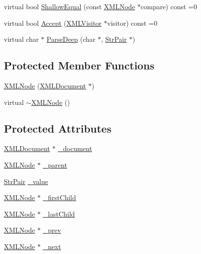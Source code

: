 \begin{DoxyCompactItemize}
\item 
virtual bool \hyperlink{classtinyxml2_1_1_x_m_l_node_a7ce18b751c3ea09eac292dca264f9226}{Shallow\+Equal} (const \hyperlink{classtinyxml2_1_1_x_m_l_node}{X\+M\+L\+Node} $\ast$compare) const =0
\item 
virtual bool \hyperlink{classtinyxml2_1_1_x_m_l_node_a81e66df0a44c67a7af17f3b77a152785}{Accept} (\hyperlink{classtinyxml2_1_1_x_m_l_visitor}{X\+M\+L\+Visitor} $\ast$visitor) const =0
\item 
virtual char $\ast$ \hyperlink{classtinyxml2_1_1_x_m_l_node_a7610d0f603e8b603d2078521811a23c1}{Parse\+Deep} (char $\ast$, \hyperlink{classtinyxml2_1_1_str_pair}{Str\+Pair} $\ast$)
\end{DoxyCompactItemize}
\subsection*{Protected Member Functions}
\begin{DoxyCompactItemize}
\item 
\hyperlink{classtinyxml2_1_1_x_m_l_node_a29868df6ca383d574f584dfdd15105b6}{X\+M\+L\+Node} (\hyperlink{classtinyxml2_1_1_x_m_l_document}{X\+M\+L\+Document} $\ast$)
\item 
virtual \hyperlink{classtinyxml2_1_1_x_m_l_node_a8f41e898cdd4da4cdbb7f05b0c7d9f69}{$\sim$\+X\+M\+L\+Node} ()
\end{DoxyCompactItemize}
\subsection*{Protected Attributes}
\begin{DoxyCompactItemize}
\item 
\hyperlink{classtinyxml2_1_1_x_m_l_document}{X\+M\+L\+Document} $\ast$ \hyperlink{classtinyxml2_1_1_x_m_l_node_a8d2d2be0bb6797625551eb0e91f0ff62}{\+\_\+document}
\item 
\hyperlink{classtinyxml2_1_1_x_m_l_node}{X\+M\+L\+Node} $\ast$ \hyperlink{classtinyxml2_1_1_x_m_l_node_a176dd1c4965c21c366de192164aa2c13}{\+\_\+parent}
\item 
\hyperlink{classtinyxml2_1_1_str_pair}{Str\+Pair} \hyperlink{classtinyxml2_1_1_x_m_l_node_a3ea9884098b8379de2bb5ab3fc85c0fc}{\+\_\+value}
\item 
\hyperlink{classtinyxml2_1_1_x_m_l_node}{X\+M\+L\+Node} $\ast$ \hyperlink{classtinyxml2_1_1_x_m_l_node_aa20c91e4213dc930c5bdf420322ca342}{\+\_\+first\+Child}
\item 
\hyperlink{classtinyxml2_1_1_x_m_l_node}{X\+M\+L\+Node} $\ast$ \hyperlink{classtinyxml2_1_1_x_m_l_node_a099b6560ae44ab9edb8453aaf1a3747b}{\+\_\+last\+Child}
\item 
\hyperlink{classtinyxml2_1_1_x_m_l_node}{X\+M\+L\+Node} $\ast$ \hyperlink{classtinyxml2_1_1_x_m_l_node_a9739eb0fb9a1188266052055e7a6bf6b}{\+\_\+prev}
\item 
\hyperlink{classtinyxml2_1_1_x_m_l_node}{X\+M\+L\+Node} $\ast$ \hyperlink{classtinyxml2_1_1_x_m_l_node_a27e985496b37dd00eb5b9cf59b9e3fb1}{\+\_\+next}
\end{DoxyCompactItemize}

